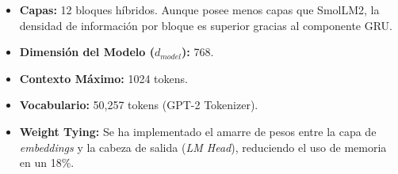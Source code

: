 \begin{itemize}
    \item \textbf{Capas:} 12 bloques híbridos. Aunque posee menos capas que SmolLM2, la densidad de información por bloque es superior gracias al componente GRU.
    \item \textbf{Dimensión del Modelo ($d_{model}$):} 768.
    \item \textbf{Contexto Máximo:} 1024 tokens.
    \item \textbf{Vocabulario:} 50,257 tokens (GPT-2 Tokenizer).
    \item \textbf{Weight Tying:} Se ha implementado el amarre de pesos entre la capa de \textit{embeddings} y la cabeza de salida (\textit{LM Head}), reduciendo el uso de memoria en un 18\%.
\end{itemize}

